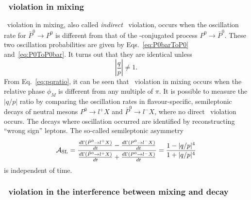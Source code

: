 \subsubsection*{~violation in mixing}

\CP~violation in mixing, also called \emph{indirect} \CP~violation, occurs when the oscillation rate for $\bar P^0\to P^0$ is different from that of the \CP-conjugated process $P^0\to \bar P^0$.
These two oscillation probabilities are given by Eqs.~\ref{eq:P0barToP0} and~\ref{eq:P0ToP0bar}. It turns out that they are identical unless
\begin{equation}
	\left| \frac{q}{p} \right| \neq 1.
\end{equation}
From Eq.~\ref{eq:pqratio}, it can be seen that \CP~violation in mixing occurs when the relative phase $\phi_M$ is different from any multiple of $\pi$. It is possible to measure the $|q/p|$ ratio by comparing the oscillation rates in flavour-specific, semileptonic decays of neutral mesons $P^0\to l^+ X$ and $\bar P^0\to l^-X$, where no direct \CP~violation occurs. The decays where oscillation occurred are identified by reconstructing ``wrong sign'' leptons.
The so-called semileptonic asymmetry
\begin{equation}
	\mathcal A_{\rm SL} = \frac{\frac{d\Gamma(\bar P^0\to l^+X)}{dt} - \frac{d\Gamma(P^0\to l^-X)}{dt} }{\frac{d\Gamma(\bar P^0\to l^+X)}{dt} + \frac{d\Gamma(P^0\to l^-X)}{dt}} = \frac{1-|q/p|^4}{1+|q/p|^4}
\end{equation} 
is independent of time.

\subsubsection*{~violation in the interference between mixing and decay}

